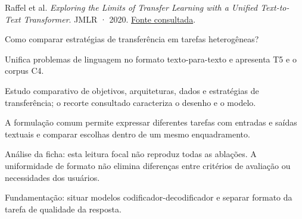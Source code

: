 {\small Raffel et al. \textit{Exploring the Limits of Transfer Learning with a Unified Text-to-Text Transformer}. JMLR · 2020. \href{https://jmlr.org/papers/volume21/20-074/20-074.pdf}{Fonte consultada}.\par}

Como comparar estratégias de transferência em tarefas heterogêneas?

Unifica problemas de linguagem no formato texto-para-texto e apresenta T5 e o corpus C4.

Estudo comparativo de objetivos, arquiteturas, dados e estratégias de transferência; o recorte consultado caracteriza o desenho e o modelo.

A formulação comum permite expressar diferentes tarefas com entradas e saídas textuais e comparar escolhas dentro de um mesmo enquadramento.

\begin{itemize}
\end{itemize}

Análise da ficha: esta leitura focal não reproduz todas as ablações. A uniformidade de formato não elimina diferenças entre critérios de avaliação ou necessidades dos usuários.

Fundamentação: situar modelos codificador-decodificador e separar formato da tarefa de qualidade da resposta.

